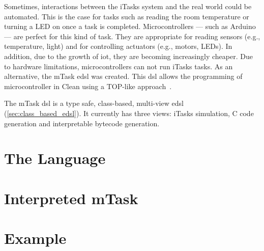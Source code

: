 Sometimes, interactions between the iTasks system and the real world could be automated. This is the case for tasks such as reading the room temperature or turning a LED on once a task is completed. Microcontrollers --- such as Arduino --- are perfect for this kind of task. They are appropriate for reading sensors (e.g., temperature, light) and for controlling actuators (e.g., motors, LEDs). In addition, due to the growth of \ac{iot}, they are becoming increasingly cheaper. Due to hardware limitations, microcontrollers can not run iTasks tasks. As an alternative, the mTask \ac{edsl} was created. This \ac{dsl} allows the programming of microcontroller in Clean using a TOP-like approach~\cite{clean,mtasks,mtasks2,martthesis}.

The mTask \ac{dsl} is a type safe, class-based, multi-view \ac{edsl} (\autoref{sec:class_based_edsl}). It currently has three views: iTasks simulation, C code generation and interpretable bytecode generation. 





\section{The Language}

\section{Interpreted mTask}

\section{Example}
